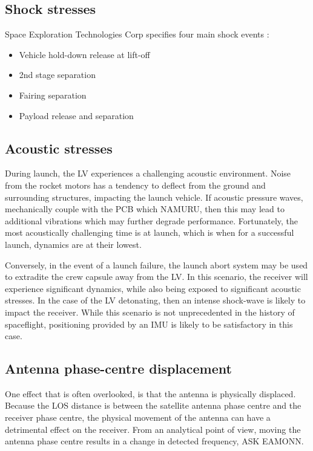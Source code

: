 \subsection{Shock stresses}
Space Exploration Technologies Corp  specifies four main shock events
\cite{Falcon9}: 
\begin{itemize}
\item{Vehicle hold-down release at lift-off} 
\item{2nd stage separation}
\item{Fairing separation}
\item{Payload release and separation}
\end{itemize}

\subsection{Acoustic stresses}
During launch, the \ac{LV} experiences a challenging acoustic environment. Noise from the rocket motors has a tendency to deflect from the ground and surrounding structures, impacting the launch vehicle. If acoustic pressure waves, mechanically couple with the \ac{PCB} which \ac{NAMURU}, then this may lead to additional vibrations which may further degrade performance. Fortunately, the most acoustically challenging time is at launch, which is when for a successful launch, dynamics are at their lowest. 

Conversely, in the event of a launch failure, the launch abort system may be used to extradite the crew capsule away from the \ac{LV}. In this scenario, the receiver will experience significant dynamics, while also being exposed to significant acoustic stresses. In the case of the \ac{LV} detonating, then an intense shock-wave is likely to impact the receiver. While this scenario is not unprecedented in the history of spaceflight, positioning provided by an \ac{IMU} is likely to be satisfactory in this case.


\subsection{Antenna phase-centre displacement}
One effect that is often overlooked, is that the antenna is physically displaced. Because the LOS distance is between the satellite antenna phase centre and the receiver phase centre, the physical movement of the antenna can have a detrimental effect on the receiver. From an analytical point of view, moving the antenna phase centre results in a change in detected frequency,  ASK EAMONN.

